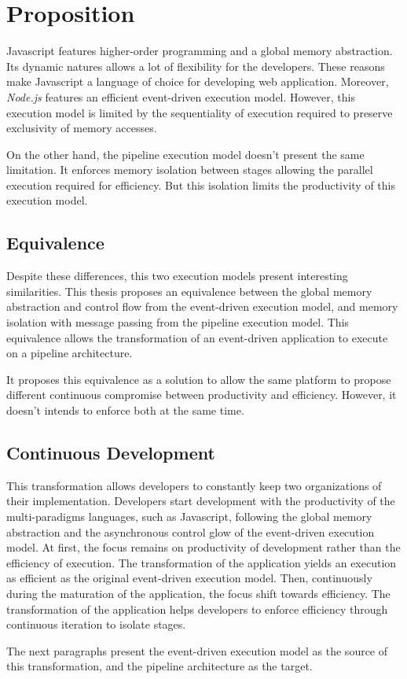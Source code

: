 \section{Proposition} \label{chapter4:proposition}

Javascript features higher-order programming and a global memory abstraction.
Its dynamic natures allows a lot of flexibility for the developers.
These reasons make Javascript a language of choice for developing web application.
Moreover, \textit{Node.js} features an efficient event-driven execution model.
However, this execution model is limited by the sequentiality of execution required to preserve exclusivity of memory accesses.

On the other hand, the pipeline execution model doesn't present the same limitation.
It enforces memory isolation between stages allowing the parallel execution required for efficiency.
But this isolation limits the productivity of this execution model.

\subsection{Equivalence}

Despite these differences, this two execution models present interesting similarities.
This thesis proposes an equivalence between the global memory abstraction and control flow from the event-driven execution model, and memory isolation with message passing from the pipeline execution model.
This equivalence allows the transformation of an event-driven application to execute on a pipeline architecture.

It proposes this equivalence as a solution to allow the same platform to propose different continuous compromise between productivity and efficiency.
However, it doesn't intends to enforce both at the same time.


\subsection{Continuous Development}


This transformation allows developers to constantly keep two organizations of their implementation. %
Developers start development with the productivity of the multi-paradigms languages, such as Javascript, following the global memory abstraction and the asynchronous control glow of the event-driven execution model.
At first, the focus remains on productivity of development rather than the efficiency of execution.
The transformation of the application yields an execution as efficient as the original event-driven execution model.
Then, continuously during the maturation of the application, the focus shift towards efficiency.
The transformation of the application helps developers to enforce efficiency through continuous iteration to isolate stages.

The next paragraphs present the event-driven execution model as the source of this transformation, and the pipeline architecture as the target.